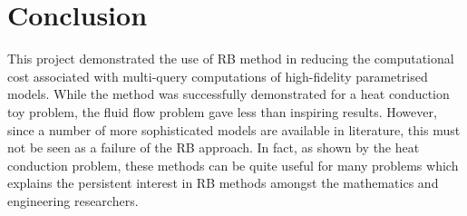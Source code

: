 \documentclass[11pt, oneside]{article}
\begin{document}
\section{Conclusion}
This project demonstrated the use of RB method in reducing the computational cost associated with multi-query computations of high-fidelity parametrised models. While the method was successfully demonstrated for a heat conduction toy problem, the fluid flow problem gave less than inspiring results. However, since a number of more sophisticated models are available in literature, this must not be seen as a failure of the RB approach. In fact, as shown by the heat conduction problem, these methods can be quite useful for many problems which explains the persistent interest in RB methods amongst the mathematics and engineering researchers.

  
  
\end{document}
